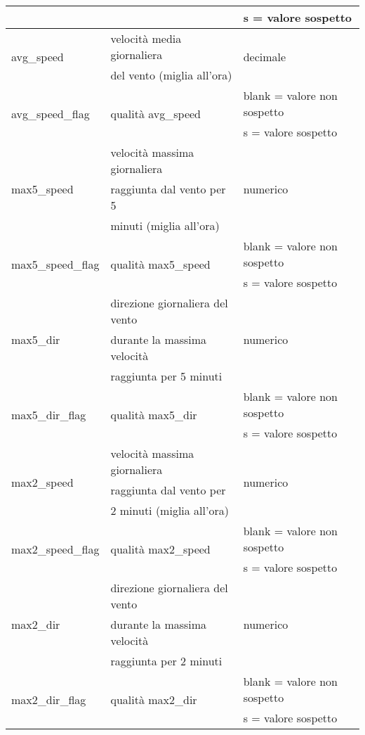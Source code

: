 \begin{longtable}{lll}
	& & s = valore sospetto			 \\ 
	\hline		
	\multirow{2}{*}{avg\_speed}		& velocità media giornaliera 	 & 	\multirow{2}{*}{decimale}	\\ 
	& del vento (miglia all'ora) &\\
	\hline	
	\multirow{2}{*}{avg\_speed\_flag}		& \multirow{2}{*}{qualità avg\_speed} &  blank = valore non sospetto \\
	& & s = valore sospetto			 \\ 
	\hline		
	\multirow{3}{*}{max5\_speed}		& velocità massima giornaliera 	 & 	\multirow{3}{*}{numerico}	\\ 
	& raggiunta dal vento per 5 &\\
	& minuti (miglia all'ora) &\\
	\hline	
	\multirow{2}{*}{max5\_speed\_flag}		& \multirow{2}{*}{qualità max5\_speed} &  blank = valore non sospetto \\
	& & s = valore sospetto			 \\ 
	\hline		
	\multirow{3}{*}{max5\_dir}		& direzione giornaliera del vento  & 	\multirow{3}{*}{numerico}	\\ 
	& durante la massima velocità  &\\
	& raggiunta per 5 minuti &\\
	\hline
	\multirow{2}{*}{max5\_dir\_flag}		& \multirow{2}{*}{qualità max5\_dir} &  blank = valore non sospetto \\
	& & s = valore sospetto			 \\ 
	\hline	
	\multirow{3}{*}{max2\_speed}		& velocità massima giornaliera 	 & 	\multirow{3}{*}{numerico}	\\ 
	& raggiunta dal vento per &\\
	& 2 minuti (miglia all'ora) &\\
	\hline		
	\multirow{2}{*}{max2\_speed\_flag}		& \multirow{2}{*}{qualità max2\_speed} &  blank = valore non sospetto \\
	& & s = valore sospetto			 \\ 
	\hline			
	\multirow{3}{*}{max2\_dir}		& direzione giornaliera del vento  & 	\multirow{3}{*}{numerico}	\\ 
	& durante la massima velocità  &\\
	& raggiunta per 2 minuti &\\
	\hline
	\multirow{2}{*}{max2\_dir\_flag}		& \multirow{2}{*}{qualità max2\_dir} &  blank = valore non sospetto \\
	& & s = valore sospetto			 \\ 
	\bottomrule
\end{longtable}
\label{tab:attributi weather}

